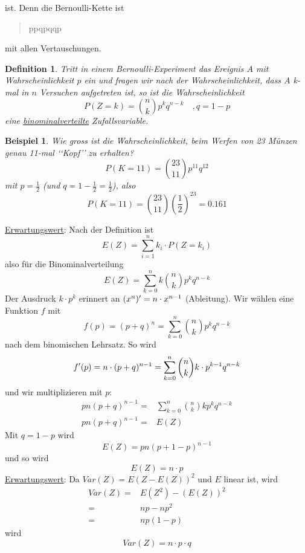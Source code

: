 \documentclass{report}
\newtheorem{mydef}{Definition}
\newtheorem{myexample}{Beispiel}
\begin{document}
ist. Denn die Bernoulli-Kette ist
\begin{quote}
ppqpqqp
\end{quote}
mit allen Vertauschungen.
\begin{mydef}Tritt in einem Bernoulli-Experiment das Ereignis $A$ mit Wahrscheinlichkeit $p$ ein und fragen wir nach der Wahrscheinlichkeit, dass $A$ k-mal in $n$ Versuchen aufgetreten ist, so ist die Wahrscheinlichkeit
\begin{equation}
P(Z=k) = \binom{n}{k} p^kq^{n-k} \quad , q=1-p
\end{equation}
eine \underline{binominalverteilte} Zufallsvariable.
\end{mydef}
\begin{myexample}
Wie gross ist die Wahrscheinlichkeit, beim Werfen von 23 Münzen genau 11-mal \lq\lq{}Kopf\rq\rq{} zu erhalten?
\begin{equation}
P(K=11) = \binom{23}{11} p^{11} q^{12}
\end{equation}
mit $p = \frac{1}{2}$ (und $q = 1 - \frac{1}{2} = \frac{1}{2}$), also
\begin{equation}
P(K=11) = \binom{23}{11} \left(\frac{1}{2}\right)^{23} = 0.161
\end{equation}
\end{myexample}
\underline{Erwartungswert}: Nach der Definition ist
\begin{equation}
E(Z) = \sum_{i=1}^n{k_i \cdot P(Z=k_i)}
\end{equation}
also für die Binominalverteilung
\begin{equation}
E(Z) = \sum_{k=0}^n{k \binom{n}{k} p^k q^{n-k}}
\end{equation}
Der Ausdruck $k \cdot p^k$ erinnert an $(x^n)\rq{} = n \cdot x^{n-1}$ (Ableitung). Wir wählen eine Funktion $f$ mit
\begin{equation}
f(p) = (p + q)^n = \sum_{k=0}^n{\binom{n}{k} p^k q^{n-k}}
\end{equation}
nach dem binomischen Lehrsatz. So wird
\begin{equation}
f\rq{}(p) = n \cdot (p+q)^{n-1} = \sum_{k=0}^n{\binom{n}{k} k \cdot p^{k-1} q^{n-k}}
\end{equation}
und wir multiplizieren mit $p$:
\begin{align*}
pn(p+q)^{n-1} = & \sum_{k=0}^n{\binom{n}{k} k p^k q^{n-k}}\\
pn(p+q)^{n-1} = & E(Z)
\end{align*}
Mit $q = 1 - p$ wird
\begin{equation}
E(Z) = pn(p+1-p)^{n-1}
\end{equation}
und so wird
\begin{equation}
E(Z) = n \cdot p
\end{equation}
\underline{Erwartungswert}: Da $Var(Z) = E(Z - E(Z))^2$ und $E$ linear ist, wird
\begin{align*}
Var(Z) = & E(Z^2) - (E(Z))^2\\
= & np -np^2\\
= & np (1-p)
\end{align*}
wird
\begin{equation}
Var(Z) = n \cdot p \cdot q
\end{equation}
\end{document}
